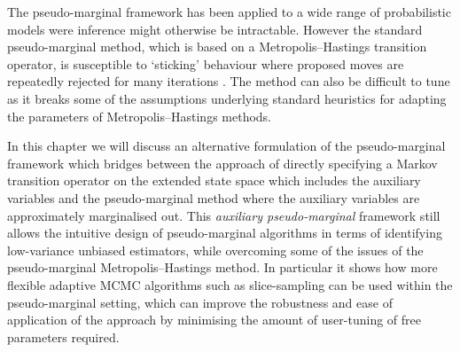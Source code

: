 The pseudo-marginal framework has been applied to a wide range of probabilistic models were inference might otherwise be intractable. However the standard pseudo-marginal method, which is based on a Metro\-polis--Hastings transition operator, is susceptible to `sticking' behaviour where proposed moves are repeatedly rejected for many iterations \citep{andrieu2009pseudo,sherlock2015efficiency}. The method can also be difficult to tune as it breaks some of the assumptions underlying standard heuristics for adapting the parameters of Metropolis--Hastings methods.




In this chapter we will discuss an alternative formulation of the pseudo-marginal framework which bridges between the approach of directly specifying a Markov transition operator on the extended state space which includes the auxiliary variables and the pseudo-marginal method where the auxiliary variables are approximately marginalised out. This \emph{auxiliary pseudo-marginal} framework still allows the intuitive design of pseudo-marginal algorithms in terms of identifying low-variance unbiased estimators, while overcoming some of the issues of the pseudo-marginal Metropolis--Hastings method. In particular it shows how more flexible adaptive \ac{MCMC} algorithms such as slice-sampling can be used within the pseudo-marginal setting, which can improve the robustness and ease of application of the approach by minimising the amount of user-tuning of free parameters required.

